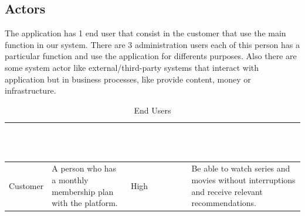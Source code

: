 \documentclass{article}
\begin{document}
\subsection{Actors}
The application has 1 end user that consist in the customer that use the main function in our system.
There are 3 administration users each of this person has a particular function and use the application for differents purposes. 
Also there are some system actor like external/third-party systems that interact with application but in business processes, like provide content, money or infrastructure. 

\begin{table}[H]

\centering

\small

\renewcommand{\arraystretch}{1.35}

\caption{End Users}

\label{tab:end_users}

\begin{tabularx}{\textwidth}{|p{2.8cm}|X|p{2.8cm}|X|}

\hline

\rowcolor[HTML]{1F2937}

\textcolor{white}{\textbf{Actor}} &
\textcolor{white}{\textbf{Role}} &
\textcolor{white}{\textbf{Frequency of interaction}} &
\textcolor{white}{\textbf{Expectation}} \\

\hline

Customer
&
A person who has a monthly membership plan with the platform.
&
High
&
Be able to watch series and movies without interruptions and receive relevant recommendations.

\\

\hline

\end{tabularx}

\end{table}
\end{document}

